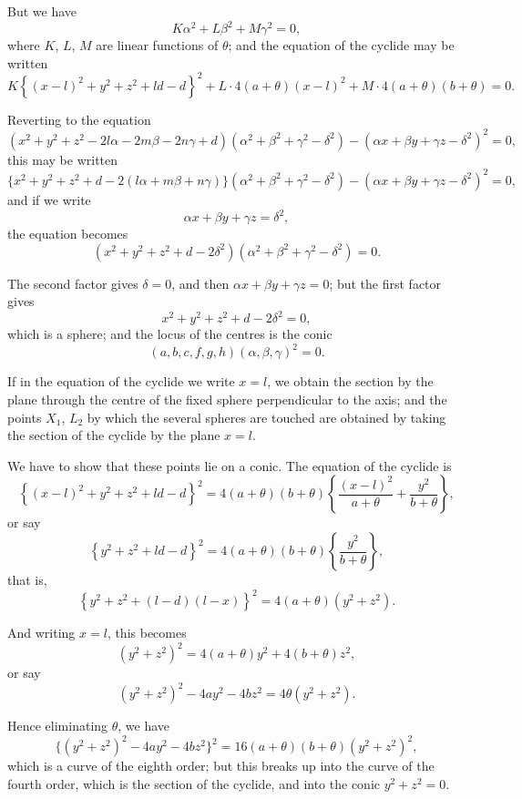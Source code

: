 \documentclass[11pt,a4paper]{article}
\theoremstyle{plain}
\theoremstyle{definition}
\theoremstyle{remark}
\begin{document}
But we have
\[
K\alpha^2 + L\beta^2 + M\gamma^2 = 0,
\]
where $K$, $L$, $M$ are linear functions of $\theta$; and the equation of the cyclide may be written
\[
K\left\{ (x - l)^2 + y^2 + z^2 + ld - d \right\}^2 + L \cdot 4(a + \theta)(x - l)^2 + M \cdot 4(a + \theta)(b + \theta) = 0.
\]

\newpage

Reverting to the equation
\[
(x^2 + y^2 + z^2 - 2l\alpha - 2m\beta - 2n\gamma + d)(\alpha^2 + \beta^2 + \gamma^2 - \delta^2) - (\alpha x + \beta y + \gamma z - \delta^2)^2 = 0,
\]
this may be written
\[
\{x^2 + y^2 + z^2 + d - 2(l\alpha + m\beta + n\gamma)\}(\alpha^2 + \beta^2 + \gamma^2 - \delta^2) - (\alpha x + \beta y + \gamma z - \delta^2)^2 = 0,
\]
and if we write
\[
\alpha x + \beta y + \gamma z = \delta^2,
\]
the equation becomes
\[
(x^2 + y^2 + z^2 + d - 2\delta^2)(\alpha^2 + \beta^2 + \gamma^2 - \delta^2) = 0.
\]

The second factor gives $\delta = 0$, and then $\alpha x + \beta y + \gamma z = 0$; but the first factor gives
\[
x^2 + y^2 + z^2 + d - 2\delta^2 = 0,
\]
which is a sphere; and the locus of the centres is the conic
\[
(a, b, c, f, g, h)(\alpha, \beta, \gamma)^2 = 0.
\]

\newpage

If in the equation of the cyclide we write $x = l$, we obtain the section by the plane through the centre of the fixed sphere perpendicular to the axis; and the points $X_1$, $L_2$ by which the several spheres are touched are obtained by taking the section of the cyclide by the plane $x = l$.

We have to show that these points lie on a conic. The equation of the cyclide is
\[
\left\{ (x - l)^2 + y^2 + z^2 + ld - d \right\}^2 = 4(a + \theta)(b + \theta)\left\{ \frac{(x - l)^2}{a + \theta} + \frac{y^2}{b + \theta} \right\},
\]
or say
\[
\left\{ y^2 + z^2 + ld - d \right\}^2 = 4(a + \theta)(b + \theta) \left\{ \frac{y^2}{b + \theta} \right\},
\]
that is,
\[
\left\{ y^2 + z^2 + (l - d)(l - x) \right\}^2 = 4(a + \theta)(y^2 + z^2).
\]

And writing $x = l$, this becomes
\[
(y^2 + z^2)^2 = 4(a + \theta)y^2 + 4(b + \theta)z^2,
\]
or say
\[
(y^2 + z^2)^2 - 4ay^2 - 4bz^2 = 4\theta(y^2 + z^2).
\]

Hence eliminating $\theta$, we have
\[
\{ (y^2 + z^2)^2 - 4ay^2 - 4bz^2 \}^2 = 16(a + \theta)(b + \theta)(y^2 + z^2)^2,
\]
which is a curve of the eighth order; but this breaks up into the curve of the fourth order, which is the section of the cyclide, and into the conic $y^2 + z^2 = 0$.
\end{document}

